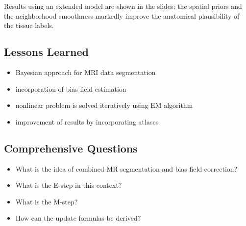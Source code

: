   Results using an extended model are shown in the slides; the spatial priors and the neighborhood smoothness markedly improve the anatomical plausibility of the tissue labels.
\subsection{Lessons Learned}
 \begin{itemize}
    \item Bayesian approach for MRI data segmentation   
    \item incorporation of bias field estimation   
    \item nonlinear problem is solved iteratively using EM algorithm   
    \item improvement of results by incorporating atlases
  \end{itemize}

\subsection{Comprehensive Questions}

  \begin{itemize}
    \item What is the idea of combined MR segmentation and bias field correction?      
    \item What is the E-step in this context?      
    \item What is the M-step?      
    \item How can the update formulas be derived?
  \end{itemize}
     
